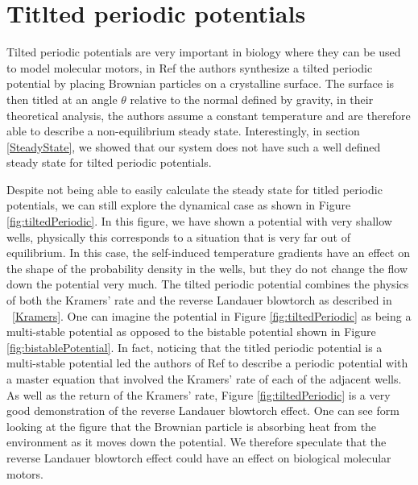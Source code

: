 
\section{Titlted periodic potentials}
Tilted periodic potentials are very important in biology where they can be used to model molecular motors, in Ref \cite{MaLaiAckersonEtAl2015, MaLaiAckersonEtAl2015a} the authors synthesize a tilted periodic potential by placing Brownian particles on a crystalline surface. The surface is then titled at an angle $\theta$ relative to the normal defined by gravity, in their theoretical analysis, the authors assume a constant temperature and are therefore able to describe a non-equilibrium steady state. Interestingly, in section \ref{SteadyState}, we showed that our system does not have such a well defined steady state for tilted periodic potentials.

Despite not being able to easily calculate the steady state for titled periodic potentials, we can still explore the dynamical case as shown in Figure \ref{fig:tiltedPeriodic}. In this figure, we have shown a potential with very shallow wells, physically this corresponds to a situation that is very far out of equilibrium. In this case, the self-induced temperature gradients have an effect on the shape of the probability density in the wells, but they do not change the flow down the potential very much. The tilted periodic potential combines the physics of both the Kramers' rate and the reverse Landauer blowtorch as described in ~\autoref{Kramers}. One can imagine the potential in Figure \ref{fig:tiltedPeriodic} as being a multi-stable potential as opposed to the bistable potential shown in Figure \ref{fig:bistablePotential}. In fact, noticing that the titled periodic potential is a multi-stable potential led the authors of Ref \cite{ChallisJack2014} to describe a periodic potential with a master equation that involved the Kramers' rate of each of the adjacent wells. As well as the return of the Kramers' rate, Figure \ref{fig:tiltedPeriodic} is a very good demonstration of the reverse Landauer blowtorch effect. One can see form looking at the figure that the Brownian particle is absorbing heat from the environment as it moves down the potential. We therefore speculate that the reverse Landauer blowtorch effect could have an effect on biological molecular motors.

